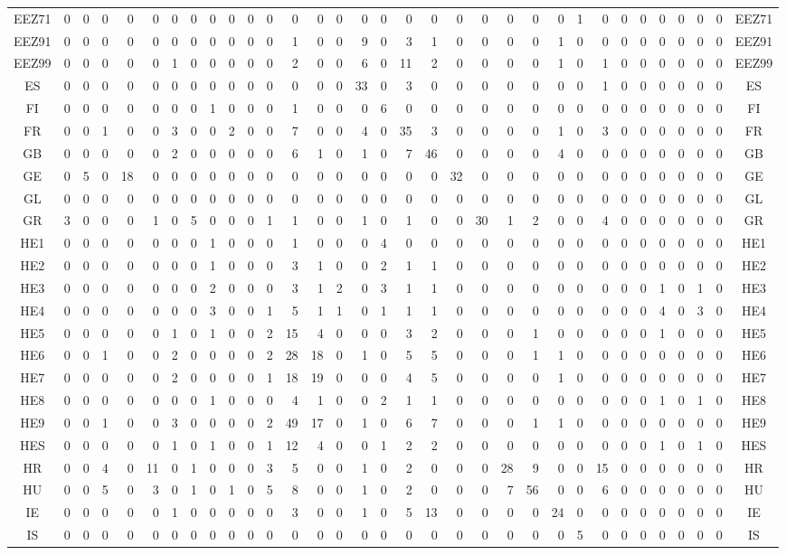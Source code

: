 \documentclass[10pt,a4paper,twoside]{report}
\begin{document}
{\begin{tabular}{crrrrrrrrrrrrrrrrrrrrrrrrrrrrrrrc}
EEZ71&0&0&0&0&0&0&0&0&0&0&0&0&0&0&0&0&0&0&0&0&0&0&0&1&0&0&0&0&0&0&0&EEZ71\\
EEZ91&0&0&0&0&0&0&0&0&0&0&0&1&0&0&9&0&3&1&0&0&0&0&1&0&0&0&0&0&0&0&0&EEZ91\\
EEZ99&0&0&0&0&0&1&0&0&0&0&0&2&0&0&6&0&11&2&0&0&0&0&1&0&1&0&0&0&0&0&0&EEZ99\\
ES&0&0&0&0&0&0&0&0&0&0&0&0&0&0&33&0&3&0&0&0&0&0&0&0&1&0&0&0&0&0&0&ES\\
FI&0&0&0&0&0&0&0&1&0&0&0&1&0&0&0&6&0&0&0&0&0&0&0&0&0&0&0&0&0&0&0&FI\\
FR&0&0&1&0&0&3&0&0&2&0&0&7&0&0&4&0&35&3&0&0&0&0&1&0&3&0&0&0&0&0&0&FR\\
GB&0&0&0&0&0&2&0&0&0&0&0&6&1&0&1&0&7&46&0&0&0&0&4&0&0&0&0&0&0&0&0&GB\\
GE&0&5&0&18&0&0&0&0&0&0&0&0&0&0&0&0&0&0&32&0&0&0&0&0&0&0&0&0&0&0&0&GE\\
GL&0&0&0&0&0&0&0&0&0&0&0&0&0&0&0&0&0&0&0&0&0&0&0&0&0&0&0&0&0&0&0&GL\\
GR&3&0&0&0&1&0&5&0&0&0&1&1&0&0&1&0&1&0&0&30&1&2&0&0&4&0&0&0&0&0&0&GR\\
HE1&0&0&0&0&0&0&0&1&0&0&0&1&0&0&0&4&0&0&0&0&0&0&0&0&0&0&0&0&0&0&0&HE1\\
HE2&0&0&0&0&0&0&0&1&0&0&0&3&1&0&0&2&1&1&0&0&0&0&0&0&0&0&0&0&0&0&0&HE2\\
HE3&0&0&0&0&0&0&0&2&0&0&0&3&1&2&0&3&1&1&0&0&0&0&0&0&0&0&0&1&0&1&0&HE3\\
HE4&0&0&0&0&0&0&0&3&0&0&1&5&1&1&0&1&1&1&0&0&0&0&0&0&0&0&0&4&0&3&0&HE4\\
HE5&0&0&0&0&0&1&0&1&0&0&2&15&4&0&0&0&3&2&0&0&0&1&0&0&0&0&0&1&0&0&0&HE5\\
HE6&0&0&1&0&0&2&0&0&0&0&2&28&18&0&1&0&5&5&0&0&0&1&1&0&0&0&0&0&0&0&0&HE6\\
HE7&0&0&0&0&0&2&0&0&0&0&1&18&19&0&0&0&4&5&0&0&0&0&1&0&0&0&0&0&0&0&0&HE7\\
HE8&0&0&0&0&0&0&0&1&0&0&0&4&1&0&0&2&1&1&0&0&0&0&0&0&0&0&0&1&0&1&0&HE8\\
HE9&0&0&1&0&0&3&0&0&0&0&2&49&17&0&1&0&6&7&0&0&0&1&1&0&0&0&0&0&0&0&0&HE9\\
HES&0&0&0&0&0&1&0&1&0&0&1&12&4&0&0&1&2&2&0&0&0&0&0&0&0&0&0&1&0&1&0&HES\\
HR&0&0&4&0&11&0&1&0&0&0&3&5&0&0&1&0&2&0&0&0&28&9&0&0&15&0&0&0&0&0&0&HR\\
HU&0&0&5&0&3&0&1&0&1&0&5&8&0&0&1&0&2&0&0&0&7&56&0&0&6&0&0&0&0&0&0&HU\\
IE&0&0&0&0&0&1&0&0&0&0&0&3&0&0&1&0&5&13&0&0&0&0&24&0&0&0&0&0&0&0&0&IE\\
IS&0&0&0&0&0&0&0&0&0&0&0&0&0&0&0&0&0&0&0&0&0&0&0&5&0&0&0&0&0&0&0&IS\\

\end{tabular}}
\end{document}
